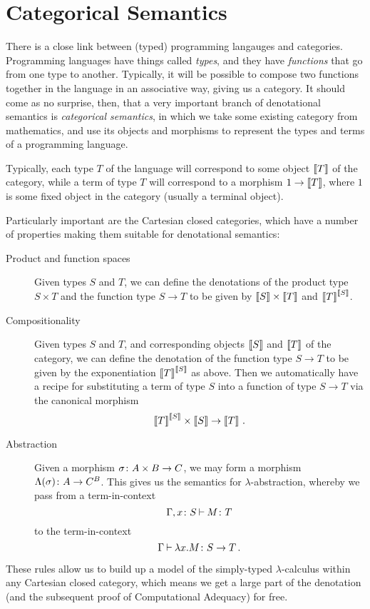 \documentclass[11pt]{report}
\begin{document}
\section{Categorical Semantics}
\label{SecCatSem}

There is a close link between (typed) programming langauges and categories.
Programming languages have things called \emph{types}, and they have \emph{functions} that go from one type to another. 
Typically, it will be possible to compose two functions together in the language in an associative way, giving us a category.
It should come as no surprise, then, that a very important branch of denotational semantics is \emph{categorical semantics}, in which we take some existing category from mathematics, and use its objects and morphisms to represent the types and terms of a programming language.

Typically, each type $T$ of the language will correspond to some object $\left\llbracket T\right\rrbracket$ of the category, while a term of type $T$ will correspond to a morphism $1 \to \left\llbracket T\right\rrbracket$, where $1$ is some fixed object in the category (usually a terminal object).

Particularly important \cite{Lambek} are the Cartesian closed categories, which have a number of properties making them suitable for denotational semantics:
\begin{description}
  \item[Product and function spaces] Given types $S$ and $T$, we can define the denotations of the product type $S \times T$ and the function type $S \to T$ to be given by $\left\llbracket S\right\rrbracket \times \left\llbracket T\right\rrbracket$ and ${\left\llbracket T\right\rrbracket}^{\left\llbracket S\right\rrbracket}$.
  \item[Compositionality] Given types $S$ and $T$, and corresponding objects $\left\llbracket S\right\rrbracket$ and $\left\llbracket T\right\rrbracket$ of the category, we can define the denotation of the function type $S \to T$ to be given by the exponentiation ${\left\llbracket T\right\rrbracket}^{\left\llbracket S\right\rrbracket}$ as above.
    Then we automatically have a recipe for substituting a term of type $S$ into a function of type $S\to T$ via the canonical morphism
    \[
      {\left\llbracket T\right\rrbracket}^{\left\llbracket S\right\rrbracket} \times \left\llbracket S\right\rrbracket \to \left\llbracket T\right\rrbracket\,.
      \]
  \item[Abstraction] Given a morphism $\sigma \colon A \times B \to C$, we may form a morphism $\Lambda(\sigma) \colon A \to C^B$.
    This gives us the semantics for $\lambda$-abstraction, whereby we pass from a term-in-context
    \[
      \Gamma,x\colon S \mathbin{\vdash} M \colon T
      \]
    to the term-in-context
    \[
      \Gamma \mathbin{\vdash} \lambda x.M\colon S \to T\,.
      \]
\end{description}
These rules allow us to build up a model of the simply-typed $\lambda$-calculus within any Cartesian closed category, which means we get a large part of the denotation (and the subsequent proof of Computational Adequacy) for free.  
\end{document}
